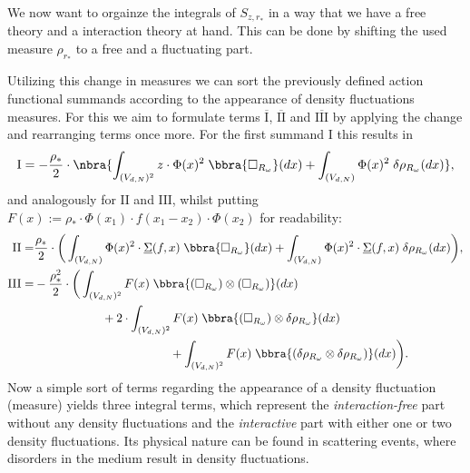 We now want to orgainze the integrals of $S_{z,r_*}$ in a way that we have a free theory and a interaction theory at hand. This can be done by shifting the used measure $\rho_{r_*}$ to a free and a fluctuating part.

Utilizing this change in measures we can sort the previously defined action functional summands according to the appearance of density fluctuations measures. For this we aim to formulate terms $\overline{\text{I}}$, $\overline{\text{II}}$ and $\overline{\text{III}}$ by applying the change and rearranging terms once more. For the first summand I this results in
\[
    \text{I} = -\frac{\rho_*}{2}\cdot\nbra{
        \int_{(V_{d,N})^2}z\cdot\Phi(x)^2\;\bbra{\square_{R_\omega}}(dx) + \int_{(V_{d,N})}\Phi(x)^2\;\delta\rho_{R_\omega}(dx)
    },
\]
and analogously for $\text{II}$ and $\text{III}$, whilst putting $F(x):=\rho_*\cdot\Phi(x_1)\cdot f(x_1 - x_2)\cdot\Phi(x_2)$ for readability:
\begin{align*}
    \text{II} =& \frac{\rho_*}{2}\cdot\bigg(
        \int_{(V_{d,N})}\Phi(x)^2\cdot \underline\Sigma(f,x)\;\bbra{\square_{R_\omega}}(dx) + \int_{(V_{d,N})}\Phi(x)^2\cdot\underline\Sigma(f,x)\;\delta\rho_{R_\omega}(dx)
    \bigg), \\
    \text{III} =& -\frac{\rho_*^2}{2}\cdot\bigg(
        \int_{(V_{d,N})^2}F(x)\;\bbra{(\square_{R_\omega})\otimes(\square_{R_\omega})}(dx) \\
        &\hspace{2cm}+ 2\cdot \int_{(V_{d,N})^2}F(x)\;\bbra{(\square_{R_\omega})\otimes\delta\rho_{R_\omega}}(dx) \\
        &\hspace{4cm}+ \int_{(V_{d,N})^2}F(x)\;\bbra{(\delta\rho_{R_\omega}\otimes\delta\rho_{R_\omega})}(dx)
    \bigg).
\end{align*}
Now a simple sort of terms regarding the appearance of a density fluctuation (measure) yields three integral terms, which represent the \emph{interaction-free} part without any density fluctuations and the \emph{interactive} part with either one or two density fluctuations. 
Its physical nature can be found in scattering events, where disorders in the medium result in density fluctuations. 

